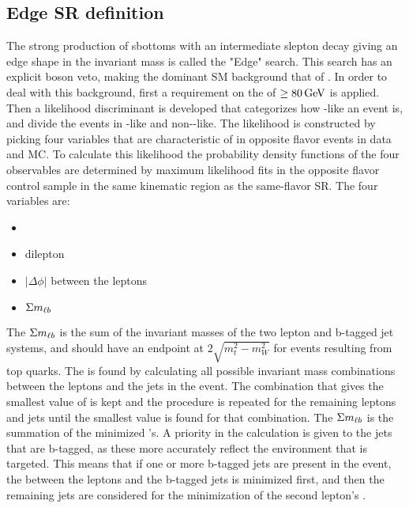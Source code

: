 \subsection{Edge SR definition}
The strong production of sbottoms with an intermediate slepton decay giving an edge shape in the invariant mass is called the "Edge" search. 
This search has an explicit \PZ boson veto, making the dominant SM background that of \ttbar. 
In order to deal with this background, first a requirement on the \mttwo of $\geq80\,\text{Ge\hspace{-.08em}V}$ is applied. 
Then a likelihood discriminant is developed that categorizes how \ttbar-like an event is, and divide the events in \ttbar-like and non-\ttbar-like.  
The \ttbar likelihood is constructed by picking four variables that are characteristic of \ttbar in opposite flavor events in data and MC.
To calculate this likelihood the probability density functions of the four observables are determined by maximum likelihood fits in the opposite flavor control sample in the same kinematic region as the same-flavor SR. 
The four variables are:
\begin{itemize}
\item \ptmiss
\item dilepton \pt
\item $|\Delta\phi|$ between the leptons
\item $\Sigma m_{\ell b}$
\end{itemize}
The $\Sigma m_{\ell b}$ is the sum of the invariant masses of the two lepton and b-tagged jet systems, and should have an endpoint at $2\sqrt{m_{t}^{2}-m_{W}^{2}}$ for events resulting from top quarks. 
The \mlb is found by calculating all possible invariant mass combinations between the leptons and the jets in the event. 
The combination that gives the smallest value of \mlb is kept and the procedure is repeated for the remaining leptons and jets until the smallest value is found for that combination.
The $\Sigma m_{\ell b}$ is the summation of the minimized \mlb's. 
A priority in the calculation is given to the jets that are b-tagged, as these more accurately reflect the \ttbar environment that is targeted.    
This means that if one or more b-tagged jets are present in the event, the \mlb between the leptons and the b-tagged jets is minimized first, and then the remaining jets are considered for the minimization of the second lepton’s \mlb.


